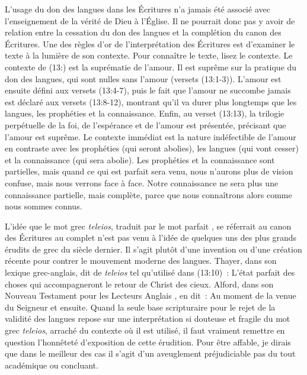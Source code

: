 L'usage du don des langues dans les Écritures n'a jamais été associé
 avec l'enseignement de la vérité de Dieu à l'Église.
 Il ne pourrait donc pas y avoir de relation entre la cessation
 du don des langues et la complétion du canon des Écritures.
 Une des règles d'or de l'interprétation des Écritures est d'examiner
 le texte à la lumière de son contexte. Pour connaître le texte,
 lisez le contexte. Le contexte de (13:) est la suprématie
 de l'amour. Il est suprême sur la pratique du don des langues,
 qui sont nulles sans l'amour (versets (13:1-3)).
 L'amour est ensuite défini aux versets (13:4-7),
 puis le fait que l'amour ne succombe jamais est déclaré aux versets
 (13:8-12), montrant qu'il va durer plus longtemps
 que les langues, les prophéties et la connaissance.
 Enfin, au verset (13:13), la trilogie perpétuelle de la foi,
 de l'espérance et de l'amour est présentée, précisant que l'amour
 est suprême. Le contexte immédiat est la nature indéfectible de l'amour
 en contraste avec les prophéties (qui seront abolies), les langues
 (qui vont cesser) et la connaissance (qui sera abolie).
 Les prophéties et la connaissance sont partielles, mais quand ce qui
 est parfait sera venu, nous n'aurons plus de vision confuse,
 mais nous verrons face à face. Notre connaissance ne sera plus
 une connaissance partielle, mais complète, parce que nous connaîtrons
 alors comme nous sommes connus.

L'idée que le mot grec \emph{teleios}, traduit par le mot \og parfait \fg{},
 se réferrait au canon des Écritures au complet n'est pas venu
 à l'idée de quelques uns des plus grands érudits de grec du siècle dernier.
 Il s'agit plutôt d'une invention ou d'une création récente pour contrer
 le mouvement moderne des langues. Thayer, dans son lexique grec-anglais,
 dit de \emph{teleios} tel qu'utilisé dans (13:10)~:
 \og L'état parfait des choses qui accompagneront le retour de Christ
 des cieux. \fg{} Alford, dans son \og Nouveau Testament pour les Lecteurs
 Anglais \fg{}, en dit~: \og Au moment de la venue du Seigneur et ensuite. \fg{}
 Quand la seule base scripturaire pour le rejet de la validité des langues
 repose sur une interprétation si douteuse et fragile du mot grec
 \emph{teleios}, arraché du contexte où il est utilisé, il faut vraiment
 remettre en question l'honnêteté d'exposition de cette érudition.
 Pour être affable, je dirais que dans le meilleur des cas il s'agit
 d'un aveuglement préjudiciable \ocadr pas du tout académique ou concluant.

